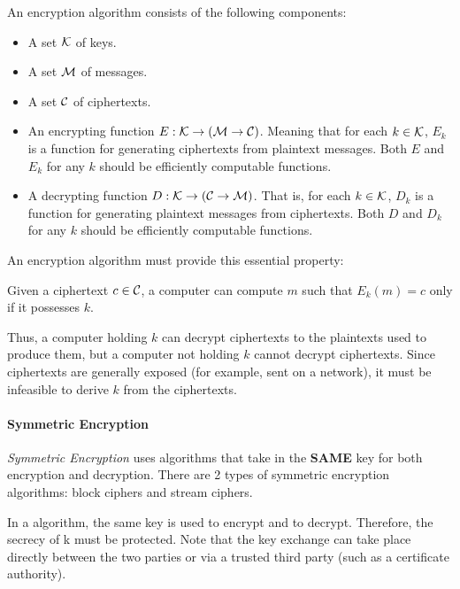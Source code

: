 An encryption algorithm consists of the following components:
\begin{itemize}[noitemsep]
\item A set $\operatorname{\mathcal{K}}$ of keys.
\item A set $\operatorname{\mathcal{M}}$ of messages.
\item A set $\operatorname{\mathcal{C}}$ of ciphertexts.
\item An encrypting function $E : \operatorname{\mathcal{K}} \to (\operatorname{\mathcal{M}} \to \operatorname{\mathcal{C}})$.
  Meaning that for each $k \in \operatorname{\mathcal{K}}$, $E_{k}$ is a function for generating ciphertexts from plaintext messages.
  Both $E$ and $E_{k}$ for any $k$ should be efficiently computable functions.
\item A decrypting function $D : \operatorname{\mathcal{K}} \to (\operatorname{\mathcal{C}} \to \operatorname{\mathcal{M}})$.
  That is, for each $k \in \operatorname{\mathcal{K}}$, $D_{k}$ is a function for generating plaintext messages from ciphertexts.
  Both $D$ and $D_{k}$ for any $k$ should be efficiently computable functions.
\end{itemize}

An encryption algorithm must provide this essential property:
\begin{blackbox}
Given a ciphertext $c \in \operatorname{\mathcal{C}}$, a computer can compute $m$ such that $E_{k}(m) = c$ only if it possesses $k$.
\end{blackbox}

Thus, a computer holding $k$ can decrypt ciphertexts to the plaintexts used to produce them, but a computer not holding $k$ cannot decrypt ciphertexts.
Since ciphertexts are generally exposed (for example, sent on a network), it must be infeasible to derive $k$ from the ciphertexts.

\paragraph{Symmetric Encryption}\label{par:Symmetric_Encryption}
\begin{definition}\label{def:Symmetric_Encryption}
  \emph{Symmetric Encryption} uses algorithms that take in the \textbf{SAME} key for both encryption and decryption.
  There are 2 types of symmetric encryption algorithms: block ciphers and stream ciphers.
\end{definition}

In a  algorithm, the same key is used to encrypt and to decrypt.
Therefore, the secrecy of k must be protected.
Note that the key exchange can take place directly between the two parties or via a trusted third party (such as a certificate authority).

